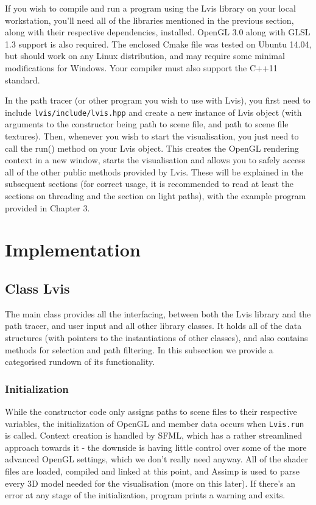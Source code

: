 If you wish to compile and run a program using the Lvis library on your local workstation, you'll need all of the libraries mentioned in the previous section, along with their respective dependencies, installed. OpenGL 3.0 along with GLSL 1.3 support is also required. The enclosed Cmake file was tested on Ubuntu 14.04, but should work on any Linux distribution, and may require some minimal modifications for Windows. Your compiler must also support the C++11 standard.

In the path tracer (or other program you wish to use with Lvis), you first need to include \texttt{lvis/include/lvis.hpp} and create a new instance of Lvis object (with arguments to the constructor being path to scene file, and path to scene file textures). Then, whenever you wish to start the visualisation, you just need to call the run() method on your Lvis object. This creates the OpenGL rendering context in a new window, starts the visualisation and allows you to safely access all of the other public methods provided by Lvis. These will be explained in the subsequent sections (for correct usage, it is recommended to read at least the sections on threading and the section on light paths), with the example program provided in Chapter 3. 

\section{Implementation}

\subsection{Class Lvis}

The main class provides all the interfacing, between both the Lvis library and the path tracer, and user input and all other library classes. It holds all of the data structures (with pointers to the instantiations of other classes), and also contains methods for selection and path filtering. In this subsection we provide a categorised rundown of its functionality.

\subsubsection{Initialization}

While the constructor code only assigns paths to scene files to their respective variables, the initialization of OpenGL and member data occurs when \texttt{Lvis.run} is called. Context creation is handled by SFML, which has a rather streamlined approach towards it - the downside is having little control over some of the more advanced OpenGL settings, which we don't really need anyway. All of the shader files are loaded, compiled and linked at this point, and Assimp is used to parse every 3D model needed for the visualisation (more on this later). If there's an error at any stage of the initialization, program prints a warning and exits.  

